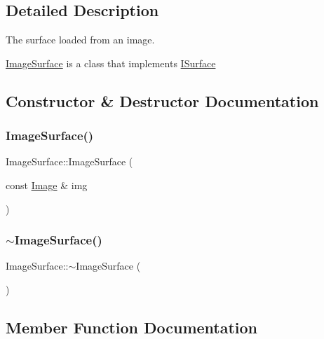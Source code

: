 \subsection{Detailed Description}
The surface loaded from an image. 

\mbox{\hyperlink{class_image_surface}{Image\+Surface}} is a class that implements \mbox{\hyperlink{class_i_surface}{I\+Surface}} 

\subsection{Constructor \& Destructor Documentation}
\mbox{\label{class_image_surface_aa0d6aea6a18bad9f802a5ec4a29585bf}} 
\subsubsection{\texorpdfstring{Image\+Surface()}{ImageSurface()}}
{\footnotesize\ttfamily Image\+Surface\+::\+Image\+Surface (\begin{DoxyParamCaption}\item[{const \mbox{\hyperlink{class_image}{Image}} \&}]{img }\end{DoxyParamCaption})}

\mbox{\label{class_image_surface_a2e64cbd6f3d98f554bfdd43507e38412}} 
\subsubsection{\texorpdfstring{$\sim$\+Image\+Surface()}{~ImageSurface()}}
{\footnotesize\ttfamily Image\+Surface\+::$\sim$\+Image\+Surface (\begin{DoxyParamCaption}{ }\end{DoxyParamCaption})\hspace{0.3cm}{\ttfamily [virtual]}}



\subsection{Member Function Documentation}
\mbox{\label{class_image_surface_a029eeccddbb6e028a4556a8c33756a56}} 
